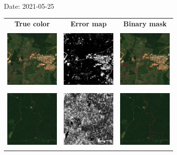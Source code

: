 \documentclass{beamer}
\begin{document}
\begin{frame}{Date: 2021-05-25}
    \begin{tabular}{ccc}
        \textbf{True color} & \textbf{Error map} & \textbf{Binary mask}\\
        \includegraphics[width=2.7cm,height=3cm]{Figures/v6/20210525/TCI_zoom5.png}& \includegraphics[width=2.7cm,height=3cm]{Figures/v6/20210525/error_map_zoom5.png} &\includegraphics[width=2.7cm,height=3cm]{Figures/v6/20210525/zoom5_BI.png}\\
        \includegraphics[width=2.7cm,height=3cm]{Figures/v6/20210525/TCI_zoom6.png}& \includegraphics[width=2.7cm,height=3cm]{Figures/v6/20210525/error_map_zoom6.png} &\includegraphics[width=2.7cm,height=3cm]{Figures/v6/20210525/zoom6_BI.png}\\
        \end{tabular}
\end{frame}
\end{document}
